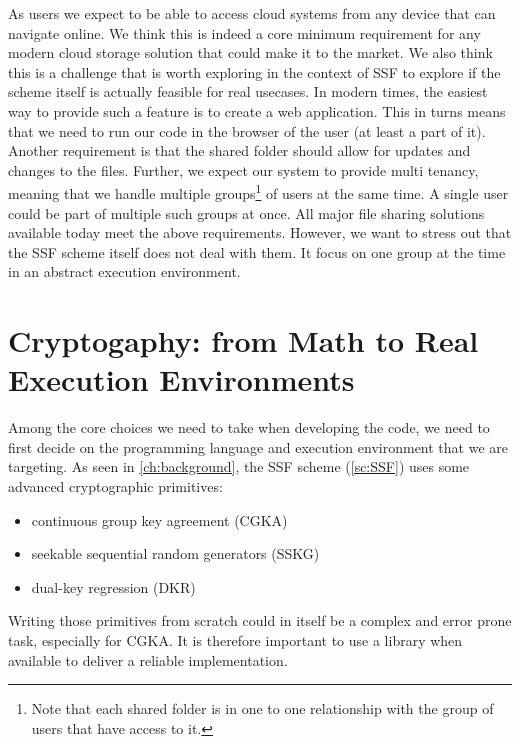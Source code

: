 As users we expect to be able to access 
cloud systems from any device that can navigate online.
We think this is indeed a core minimum requirement for any modern
cloud storage solution that could make it to the market.
We also think this is a challenge that is worth exploring
in the context of SSF to explore if the scheme itself is
actually feasible for real usecases.
In modern times, the easiest way
to provide such a feature is to create a web application.
This in turns means that we need to run our code in the
browser of the user (at least a part of it).
Another requirement is that the shared folder should
allow for updates and changes to the files.
Further, we expect our system to provide multi tenancy,
meaning that we handle multiple groups\footnote{Note that each shared folder is in one to one relationship with the group of users that have access to it.}
of users at the same time. 
A single user could be part of multiple such groups at once. 
All major file sharing solutions available today meet the above requirements.
However, we want to stress out that the SSF scheme itself does not deal with them.
It focus on one group at the time in an abstract execution
environment.

\section{Cryptogaphy: from Math to Real Execution Environments}\label{sc:abstract-to-real}

Among the core choices we need to take when developing
the code, we need to first
decide on the programming language and execution
environment that we are targeting.
As seen in \cref{ch:background}, the SSF scheme (\cref{sc:SSF})
uses some advanced cryptographic primitives:
\begin{itemize}
    \item continuous group key agreement (CGKA)
    \item seekable sequential random generators (SSKG)
    \item dual-key regression (DKR)
\end{itemize}
Writing those primitives from scratch could in itself
be a complex and error prone task, especially for CGKA.
It is therefore important to use a library when available
to deliver a reliable implementation.

